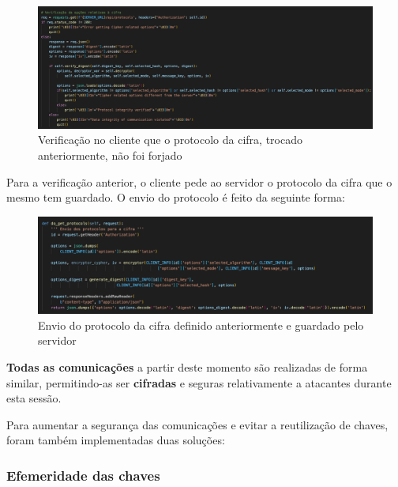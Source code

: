 \documentclass[10pt,english]{article}
\begin{document}
\begin{figure}[!h]
        \centering
        \includegraphics[width=\textwidth]{images/verify_cipher_suite.png}
        \caption{Verificação no cliente que o protocolo da cifra, trocado anteriormente, não foi forjado}
\end{figure}

\par Para a verificação anterior, o cliente pede ao servidor o protocolo da cifra que o mesmo tem guardado. O envio do protocolo é feito da seguinte forma:

\begin{figure}[!h]
        \centering
        \includegraphics[width=\textwidth]{images/get_cipher_suite.png}
        \caption{Envio do protocolo da cifra definido anteriormente e guardado pelo servidor}
\end{figure}

\par \textbf{Todas as comunicações} a partir deste momento são realizadas de forma similar, permitindo-as ser \textbf{cifradas} e seguras relativamente a atacantes durante esta sessão. 

\clearpage

\par Para aumentar a segurança das comunicações e evitar a reutilização de chaves, foram também implementadas duas soluções:

\subsubsection{Efemeridade das chaves}
\end{document}
